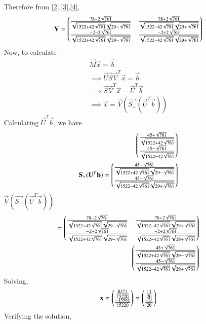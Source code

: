 \documentclass[journal,12pt,twocolumn]{IEEEtran}
\begin{document}
Therefore from \eqref{2},\eqref{3},\eqref{4},
\begin{align}
 \mathbf{V}=\begin{pmatrix}\frac{78-2\sqrt{761}}{\sqrt{1522+42\sqrt{761}}\sqrt{29-\sqrt{761}}}&\frac{78+2\sqrt{761}}{\sqrt{1522-42\sqrt{761}}\sqrt{29+\sqrt{761}}}\\\frac{-2-2\sqrt{761}}{\sqrt{1522+42\sqrt{761}}\sqrt{29-\sqrt{761}}}&\frac{-2+2\sqrt{761}}{\sqrt{1522-42\sqrt{761}}\sqrt{29+\sqrt{761}}}\end{pmatrix}   
\end{align}
Now, to calculate 
\begin{align}
  \vec{M}\vec{x}=\vec{b}\\
  \implies \vec{U}\vec{S}\vec{V}^T\vec{x}=\vec{b}\\
  \implies \vec{S}\vec{V}^T\vec{x}=\vec{U}^T\vec{b}\\
  \implies \vec{x}=\vec{V}(\vec{S_+}(\vec{U}^T\vec{b}))
\end{align}
Calculating $\vec{U}^T\vec{b}$, we have
\begin{align}
  \begin{pmatrix}\frac{45+\sqrt{761}}{\sqrt{1522+42\sqrt{761}}}\\\frac{45-\sqrt{761}}{\sqrt{1522-42\sqrt{761}}}\end{pmatrix} \\
 \mathbf{S_+}(\mathbf{U}^T\mathbf{b})=\begin{pmatrix}\frac{45+\sqrt{761}}{\sqrt{1522+42\sqrt{761}}\sqrt{29-\sqrt{761}}}\\\frac{45-\sqrt{761}}{\sqrt{1522-42\sqrt{761}}\sqrt{29+\sqrt{761}}}\end{pmatrix}
 \end{align}
 $\vec{V}(\vec{S_+}(\vec{U}^T\vec{b}))$
 \begin{align}
 =\begin{pmatrix}\frac{78-2\sqrt{761}}{\sqrt{1522+42\sqrt{761}}\sqrt{29-\sqrt{761}}}&\frac{78+2\sqrt{761}}{\sqrt{1522-42\sqrt{761}}\sqrt{29+\sqrt{761}}}\\\frac{-2-2\sqrt{761}}{\sqrt{1522+42\sqrt{761}}\sqrt{29-\sqrt{761}}}&\frac{-2+2\sqrt{761}}{\sqrt{1522-42\sqrt{761}}\sqrt{29+\sqrt{761}}}\end{pmatrix} \\
 \begin{pmatrix}\frac{45+\sqrt{761}}{\sqrt{1522+42\sqrt{761}}\sqrt{29-\sqrt{761}}}\\\frac{45-\sqrt{761}}{\sqrt{1522-42\sqrt{761}}\sqrt{29+\sqrt{761}}}\end{pmatrix}
\end{align}
Solving, 
\begin{align}
  \mathbf{x}=\begin{pmatrix}\frac{8371}{15220}\\\frac{-15981}{15220}\end{pmatrix}=\begin{pmatrix}\frac{11}{20}\\\frac{-21}{20}\end{pmatrix}  
\end{align}
Verifying the solution,
\end{document}

